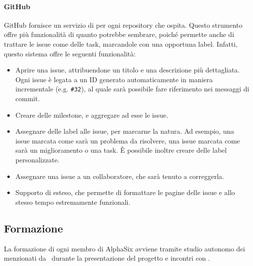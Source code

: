     		\paragraph{GitHub}\label{Github}
			GitHub fornisce un servizio di  per ogni repository che ospita. Questo strumento offre più funzionalità di quanto potrebbe sembrare, poich\'e permette anche di trattare le issue come delle task, marcandole con una opportuna label. Infatti, questo sistema offre le seguenti funzionalità:
			\begin{itemize}
				\item Aprire una issue, attribuendone un titolo e una descrizione più dettagliata. Ogni issue è legata a un ID generato automaticamente in maniera incrementale (e.g. \texttt{\#32}), al quale sarà possibile fare riferimento nei messaggi di commit.
				\item Creare delle milestone, e aggregare ad esse le issue.
				\item Assegnare delle label alle issue, per marcarne la natura. Ad esempio, una issue marcata come  sarà un problema da risolvere, una issue marcata come  sarà un miglioramento o una task. È possibile inoltre creare delle label personalizzate.
				\item Assegnare una issue a un collaboratore, che sarà tenuto a correggerla.
				\item Supporto di  esteso, che permette di 
				formattare le pagine delle issue e allo stesso tempo estremamente funzionali.			
			\end{itemize}




	\subsection{Formazione}

		La formazione di ogni membro di AlphaSix avviene tramite studio autonomo dei  menzionati da \II\ durante la presentazione del progetto e incontri con \gruppo.

